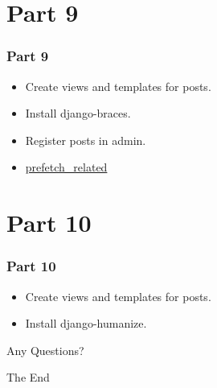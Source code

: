 \documentclass{beamer}
\begin{document}
\section{Part 9}
\begin{frame}[fragile]
\frametitle{Part 9}
\begin{itemize}
	\item Create views and templates for posts.
	\item Install django-braces.
	\item Register posts in admin.
	\item \href{https://docs.djangoproject.com/en/2.1/ref/models/querysets/}{prefetch\_related}
	
\end{itemize}
\end{frame}


\section{Part 10}
\begin{frame}
\frametitle{Part 10}
\begin{itemize}
	\item Create views and templates for posts.
	\item Install django-humanize.
\end{itemize}
\end{frame}




\begin{frame}
\Huge \centering Any Questions?
\end{frame}

\begin{frame}
\Huge \centering The End
\end{frame}
\end{document}
